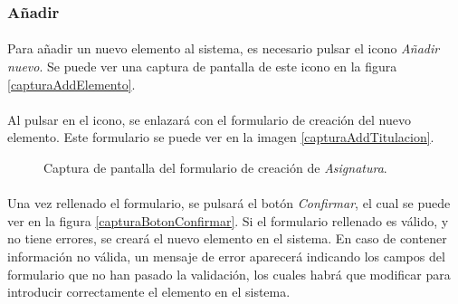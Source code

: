 \subsubsection{Añadir}

  \paragraph{}Para añadir un nuevo elemento al sistema, es necesario pulsar el
  icono \textit{Añadir nuevo}. Se puede ver una captura de pantalla de este
  icono en la figura \ref{capturaAddElemento}.

  \paragraph{}Al pulsar en el icono, se enlazará con el formulario de creación
  del nuevo elemento. Este formulario se puede ver en la imagen
  \ref{capturaAddTitulacion}.

  \begin{figure}[!ht]
    \begin{center}
      \caption{Captura de pantalla del formulario de creación de \textit{Asignatura}.}
      \label{capturaAddAsignatura}
    \end{center}
  \end{figure}

  \paragraph{}Una vez rellenado el formulario, se pulsará el botón
  \textit{Confirmar}, el cual se puede ver en la figura
  \ref{capturaBotonConfirmar}. Si el formulario rellenado es válido, y no tiene
  errores, se creará el nuevo elemento en el sistema. En caso de contener
  información no válida, un mensaje de error aparecerá indicando los campos
  del formulario que no han pasado la validación, los cuales habrá que modificar
  para introducir correctamente el elemento en el sistema.